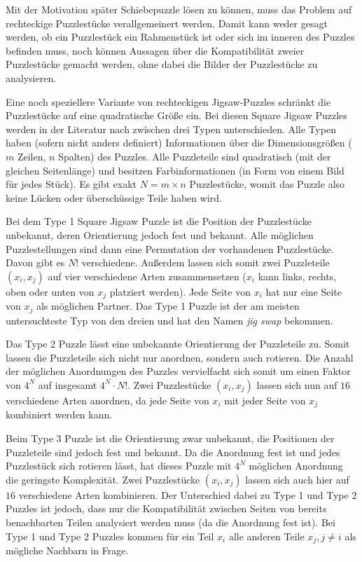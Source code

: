 \documentclass{whswinvcbook}
\begin{document}
Mit der Motivation später Schiebepuzzle lösen zu können, muss das Problem auf rechteckige Puzzlestücke verallgemeinert werden. Damit kann weder gesagt werden, ob ein Puzzlestück ein Rahmenstück ist oder sich im inneren des Puzzles befinden muss, noch können Aussagen über die Kompatibilität zweier Puzzlestücke gemacht werden, ohne dabei die Bilder der Puzzlestücke zu analysieren.

Eine noch speziellere Variante von rechteckigen Jigsaw-Puzzles schränkt die Puzzlestücke auf eine quadratische Größe ein. Bei diesen Square Jigsaw Puzzles werden in der Literatur nach \cite{gallagher} zwischen drei Typen unterschieden. Alle Typen haben (sofern nicht anders definiert) Informationen über die Dimensionsgrößen ($m$ Zeilen, $n$ Spalten) des Puzzles. Alle Puzzleteile sind quadratisch (mit der gleichen Seitenlänge) und besitzen Farbinformationen (in Form von einem Bild für jedes Stück). Es gibt exakt $N=m\times n$ Puzzlestücke, womit das Puzzle also keine Lücken oder überschüssige Teile haben wird.

Bei dem Type 1 Square Jigsaw Puzzle ist die Position der Puzzlestücke unbekannt, deren Orientierung jedoch fest und bekannt. Alle möglichen Puzzlestellungen sind dann eine Permutation der vorhandenen Puzzlestücke. Davon gibt es $N!$ verschiedene. Außerdem lassen sich somit zwei Puzzleteile $(x_i,x_j)$ auf vier verschiedene Arten zusammensetzen ($x_i$ kann links, rechts, oben oder unten von $x_j$ platziert werden). Jede Seite von $x_i$ hat nur eine Seite von $x_j$ als möglichen Partner. Das Type 1 Puzzle ist der am meisten untersuchteste Typ von den dreien und hat den Namen \textit{jig swap}\cite{loop} bekommen.

Das Type 2 Puzzle lässt eine unbekannte Orientierung der Puzzleteile zu. Somit lassen die Puzzleteile sich nicht nur anordnen, sondern auch rotieren. Die Anzahl der möglichen Anordnungen des Puzzles vervielfacht sich somit um einen Faktor von $4^N$ auf insgesamt $4^N\cdot N!$. Zwei Puzzlestücke $(x_i,x_j)$ lassen sich nun auf $16$ verschiedene Arten anordnen, da jede Seite von $x_i$ mit jeder Seite von $x_j$ kombiniert werden kann.

Beim Type 3 Puzzle ist die Orientierung zwar unbekannt, die Positionen der Puzzleteile sind jedoch fest und bekannt. Da die Anordnung fest ist und jedes Puzzlestück sich rotieren lässt, hat dieses Puzzle mit $4^N$ möglichen Anordnung die geringste Komplexität. Zwei Puzzlestücke $(x_i,x_j)$ lassen sich auch hier auf $16$ verschiedene Arten kombinieren. Der Unterschied dabei zu Type 1 und Type 2 Puzzles ist jedoch, dass nur die Kompatibilität zwischen Seiten von bereits benachbarten Teilen analysiert werden muss (da die Anordnung fest ist). Bei Type 1 und Type 2 Puzzles kommen für ein Teil $x_i$ alle anderen Teile $x_j,j\neq i$ als mögliche Nachbarn in Frage.
\end{document}
